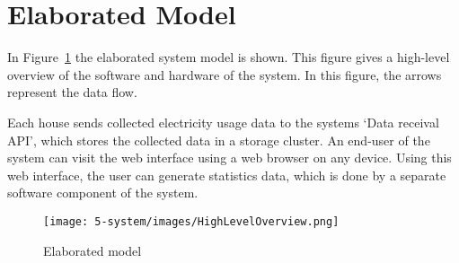 \section{Elaborated Model}
\label{sec:elaboratedmodel}

In Figure~\ref{fig:elaboratedmodel} the elaborated system model is shown. This figure gives a high-level overview of the software and hardware of the system. In this figure, the arrows represent the data flow.

Each house sends collected electricity usage data to the systems `Data receival API', which stores the collected data in a storage cluster.
An end-user of the system can visit the web interface using a web browser on any device. Using this web interface, the user can generate statistics data, which is done by a separate software component of the system.


\begin{figure}[H]
	\centering
	\texttt{[image: 5-system/images/HighLevelOverview.png]}
	\caption{Elaborated model}
	\label{fig:elaboratedmodel}
\end{figure}
